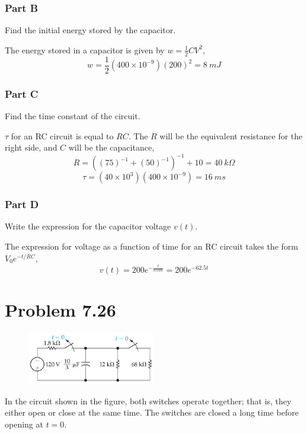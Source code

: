 \documentclass[12pt]{article}
\begin{document}
    \subsubsection*{Part B} Find the initial energy stored by the capacitor. \\
    \par The energy stored in a capacitor is given by $w = \frac{1}{2} C V^2$,
    \[
        w = \frac{1}{2} (400 \times 10^{-9}) (200)^2 = \boxed{8\ mJ}
    \]
    \subsubsection*{Part C} Find the time constant of the circuit. \\ \par $\tau$ for an RC circuit is equal to $RC$. The $R$ will be the equivalent resistance for the right side, and $C$ will be the capacitance,
    \[
        R = \left( (75)^{-1} + (50)^{-1} \right)^{-1} + 10 = 40\ k\Omega
    \]
    \[
        \tau = (40 \times 10^{3}) (400 \times 10^{-9}) = \boxed{16\ ms}
    \]
    \subsubsection*{Part D} Write the expression for the capacitor voltage $v(t)$. \\
    \par The expression for voltage as a function of time for an RC circuit takes the form $V_0e^{-t / RC}$,
    \[
        v(t) = 200e^{-\frac{t}{0.016}} = \boxed{200e^{-62.5t}}
    \]
    \section*{Problem 7.26}
    \begin{figure}[h]
        \centering
        \includegraphics[width=0.5\textwidth]{7.26 Figure.png}
    \end{figure}
    \par In the circuit shown in the figure, both switches operate together; that is, they either open or close at the same time. The switches are closed a long time before opening at $ t = 0 $.
\end{document}
